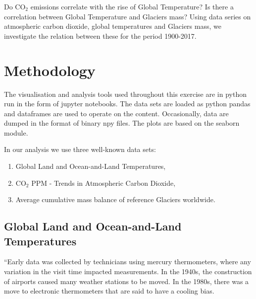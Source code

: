 \documentclass[11pt]{article}
\providecommand{\tightlist}{%
      \setlength{\itemsep}{0pt}\setlength{\parskip}{0pt}}
\begin{document}

Do CO$_2$ emissions correlate with the rise of Global Temperature? Is
there a correlation between Global Temperature and Glaciers mass? Using
data series on atmospheric carbon dioxide, global temperatures and
Glaciers mass, we investigate the relation between these for the period
1900-2017.

    \hypertarget{methodology}{%
\section{Methodology}\label{methodology}}
The visualisation and analysis tools used throughout this exercise are in python run in the form of jupyter notebooks. The data sets are loaded as python pandas and dataframes are used to operate on the content. Occasionally, data are dumped in the format of binary npy files. The plots are based on the seaborn module.
    
In our analysis we use three well-known data sets:
\begin{enumerate}
\item Global Land and Ocean-and-Land Temperatures,
\item CO$_2$ PPM - Trends in Atmospheric Carbon Dioxide,
\item Average cumulative mass balance of reference Glaciers worldwide.
\end{enumerate}
    

\subsection{Global Land and Ocean-and-Land Temperatures}

``Early data was collected by technicians using mercury thermometers,
where any variation in the visit time impacted measurements. In the
1940s, the construction of airports caused many weather stations to be
moved. In the 1980s, there was a move to electronic thermometers that
are said to have a cooling bias.
\end{document}
